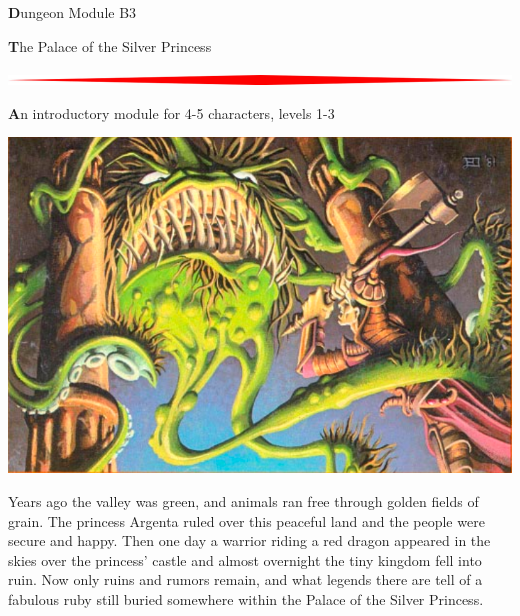 \documentclass[10pt,twoside,twocolumn]{article}
\begin{document}
\selectfont %



\begin{titlepage} 
    \begin{onecolumn}
        \begin{center}
            {\Huge \textbf Dungeon Module B3}

            {\Huge \textbf The Palace of the Silver Princess}

            \vspace{0.5cm}
            \includegraphics[width=\textwidth]{img/hr.jpg}

            \vspace{0.5cm}
            {\Large \textbf An introductory module for 4-5 characters, levels 1-3}

            \vspace{0.5cm}
            \includegraphics[width=\textwidth]{img/cover.png}

            \vspace{0.5cm}
            Years ago the valley was green, and animals ran free through golden
            fields of grain. The princess Argenta ruled over this peaceful land
            and the people were secure and happy. Then one day a warrior riding
            a red dragon appeared in the skies over the princess’ castle and
            almost overnight the tiny kingdom fell into ruin. Now only ruins and
            rumors remain, and what legends there are tell of a fabulous ruby
            still buried somewhere within the Palace of the Silver Princess.


\end{center}
\end{onecolumn}
\end{titlepage}
\end{document}
